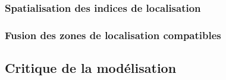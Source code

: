 \subsubsection{Spatialisation des indices de localisation}
\label{subsec:9-3-2-2}

\subsubsection{Fusion des zones de localisation compatibles}
\label{subsec:9-3-2-3}

\subsection{Critique de la modélisation}
\label{subsec:9-3-3}


